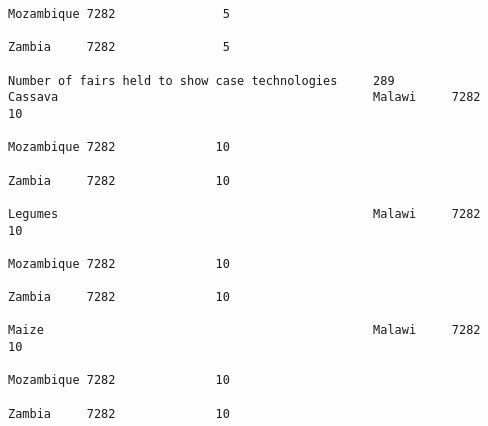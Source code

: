 \documentclass[11pt]{article}
\begin{document}
\begin{Verbatim}[commandchars=\\\{\}]
                                                                                                                                                                                                                 Mozambique 7282               5  
                                                                                                                                                                                                                 Zambia     7282               5  
                                                                         Number of fairs held to show case technologies     289                               Cassava                                            Malawi     7282              10  
                                                                                                                                                                                                                 Mozambique 7282              10  
                                                                                                                                                                                                                 Zambia     7282              10  
                                                                                                                                                              Legumes                                            Malawi     7282              10  
                                                                                                                                                                                                                 Mozambique 7282              10  
                                                                                                                                                                                                                 Zambia     7282              10  
                                                                                                                                                              Maize                                              Malawi     7282              10  
                                                                                                                                                                                                                 Mozambique 7282              10  
                                                                                                                                                                                                                 Zambia     7282              10  

\end{Verbatim}
\end{document}
